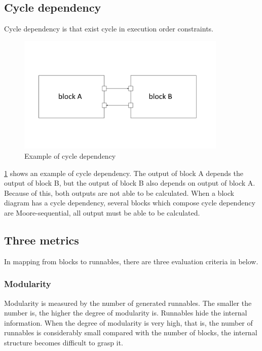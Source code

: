 \documentclass[conference,compsoc]{IEEEtran}
\begin{document}
\subsection{Cycle dependency}
 Cycle dependency is that exist cycle in execution order constraints.
\begin{figure}
	\centering
	\includegraphics[width=10cm,clip]{figure4.pdf}
	\caption{Example of cycle dependency}
	\label{fig6}
\end{figure}
 \ref{fig6} shows an example of cycle dependency.
The output of block A depends the output of block B, but the output of block B also depends on output of block A.
Because of this, both outputs are not able to be calculated.
When a block diagram has a cycle dependency, several blocks which compose cycle dependency are Moore-sequential, all output must be able to be calculated.
\subsection{Three metrics}
 In mapping from blocks to runnables, there are three evaluation criteria in below.
\subsubsection{Modularity}
 Modularity is measured by the number of generated runnables.
The smaller the number is, the higher the degree of modularity is.
Runnables hide the internal information.
When the degree of modularity is very high, that is, the number of runnables is considerably small compared with the number of blocks,
the internal structure becomes difficult to grasp it.
\end{document}
